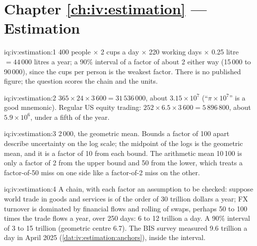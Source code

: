 \section*{Chapter \ref{ch:iv:estimation} --- Estimation}

\begin{solution}{iq:iv:estimation:1}
400 people $\times$ 2 cups a day $\times$ 220 working days $\times$ 0.25 litre $= 44\,000$ litres a year; a 90\%
interval of a factor of about 2 either way (15\,000 to 90\,000), since the cups per person is the weakest
factor. There is no published figure; the question scores the chain and the units.
\end{solution}

\begin{solution}{iq:iv:estimation:2}
$365 \times 24 \times 3\,600 = 31\,536\,000$, about $3.15 \times 10^7$ (``$\pi \times 10^7$'' is a good
mnemonic). Regular US equity trading: $252 \times 6.5 \times 3\,600 = 5\,896\,800$, about $5.9 \times 10^6$,
under a fifth of the year.
\end{solution}

\begin{solution}{iq:iv:estimation:3}
2\,000, the geometric mean. Bounds a factor of 100 apart describe uncertainty on the log scale; the midpoint of
the logs is the geometric mean, and it is a factor of 10 from each bound. The arithmetic mean 10\,100 is only a
factor of 2 from the upper bound and 50 from the lower, which treats a factor-of-50 miss on one side like a
factor-of-2 miss on the other.
\end{solution}

\begin{solution}{iq:iv:estimation:4}
A chain, with each factor an assumption to be checked: suppose world trade in goods and services is of the
order of 30 trillion dollars a year; FX turnover is dominated by
financial flows and rolling of swaps, perhaps 50 to 100 times the trade flows a year, over 250 days: 6 to 12
trillion a day. A 90\% interval of 3 to 15 trillion (geometric centre 6.7). The BIS survey measured 9.6 trillion
a day in April 2025 (\cref{dat:iv:estimation:anchors}), inside the interval.
\end{solution}

